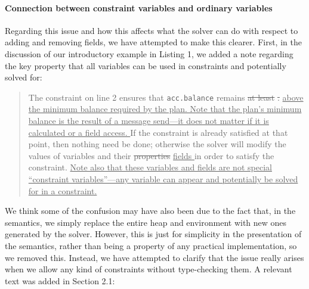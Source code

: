\documentclass[10pt,twocolumn]{article}
\providecommand{\DIFaddtex}[1]{{\protect\color{BLUE}\uline{#1}}} %
\providecommand{\DIFdeltex}[1]{{\protect\color{gray}\sout{#1}}}                      %
\providecommand{\DIFaddbegin}{} %
\providecommand{\DIFaddend}{} %
\providecommand{\DIFdelbegin}{} %
\providecommand{\DIFdelend}{} %
\providecommand{\DIFadd}[1]{\texorpdfstring{\DIFaddtex{#1}}{#1}} %
\providecommand{\DIFdel}[1]{\texorpdfstring{\DIFdeltex{#1}}{}} %
\begin{document}
\paragraph{Connection between constraint variables and ordinary variables}
Regarding this issue and how this affects what the solver can do with
respect to adding and removing fields, we have attempted to make this
clearer. First, in the discussion of our introductory example in
Listing 1, we added a note regarding the key property that all variables
can be used in constraints and potentially solved for:
\begin{quote}
The constraint on line 2 ensures that \verb!acc.balance! remains
\DIFdelbegin \DIFdel{at least }%
\DIFdel{.  }\DIFdelend \DIFaddbegin \DIFadd{above the minimum balance
  required by the plan.  Note that the plan's minimum balance is the
  result of a message send---it does not matter if it is calculated or
  a field access. }\DIFaddend If the constraint is already satisfied
at that point, then nothing need be done; otherwise the solver will
modify the values of variables and their \DIFdelbegin
\DIFdel{properties }\DIFdelend \DIFaddbegin \DIFadd{fields }\DIFaddend
in order to satisfy the constraint. \DIFaddbegin \DIFadd{Note also
  that these variables and fields are not special ``constraint
  variables''---any variable can appear and potentially be solved for
  in a constraint. }\DIFaddend  
\end{quote}
We think some of the confusion may have also been due to the fact
that, in the semantics, we simply replace the entire heap and
environment with new ones generated by the solver.  However, this is just for
simplicity in the presentation of the semantics, rather than being a
property of any practical implementation, so we removed
this. Instead, we have attempted to clarify that the issue really
arises when we allow any kind of constraints without type-checking
them. A relevant text was added in Section 2.1:
\end{document}
